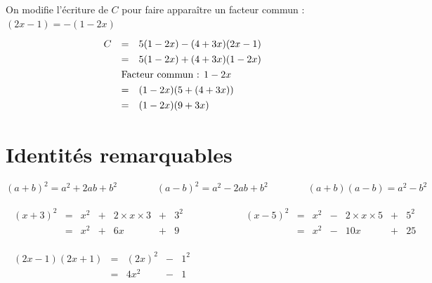\begin{methode}
\begin{correction}
\[\begin{array}{ll}
\begin{array}{rcl}
				\end{array}%
			\end{array}%
		\]
		\ms
		On modifie l'écriture de $C$ pour faire apparaître un facteur commun : $(2x - 1) = -(1 - 2x)$
		\[
			\def\arraystretch{1.3}%
			\begin{array}{rcl}%
				C & =                                                 & 5(1 - 2x) - (4 + 3x)(2x - 1) \\
				  & =                                                 & 5(1 - 2x) + (4 + 3x)(1 - 2x) \\
				  & \multicolumn{2}{l}{\text{Facteur commun : } 1-2x}                                \\
				  & =                                                 & (1 - 2x)(5 + (4 + 3x))       \\
				  & =                                                 & (1 - 2x)(9 + 3x)             \\
			\end{array}%
		\]
	\end{correction}
\end{methode}

\newpage

\section{Identités remarquables}

\begin{prop}
	\[
		{(a+b)^2 = a^2 + 2ab + b^2} \qquad\qquad {(a-b)^2 = a^2 - 2ab + b^2} \qquad\qquad {(a+b)(a-b) = a^2 - b^2}
	\]
\end{prop}

\begin{ex}
	\[
		\begin{array}{ll}%
			\begin{array}{rcccccl}%
				(x + 3)^2 & = & x^2 & + & 2 \times x \times 3 & + & 3^2 \\
				          & = & x^2 & + & 6x                  & + & 9   \\
			\end{array}\qquad & \qquad %
			\begin{array}{rcccccl}%
				(x - 5)^2 & = & x^2 & - & 2 \times x \times 5 & + & 5^2 \\
				          & = & x^2 & - & 10x                 & + & 25  \\
			\end{array} \\ & \\%
			\begin{array}{rcccl}%
				(2x - 1)(2x + 1) & = & (2x)^2 & - & 1^2 \\
				                 & = & 4x^2   & - & 1
			\end{array}\qquad      & \qquad~    %
		\end{array}%
	\]
\end{ex}

